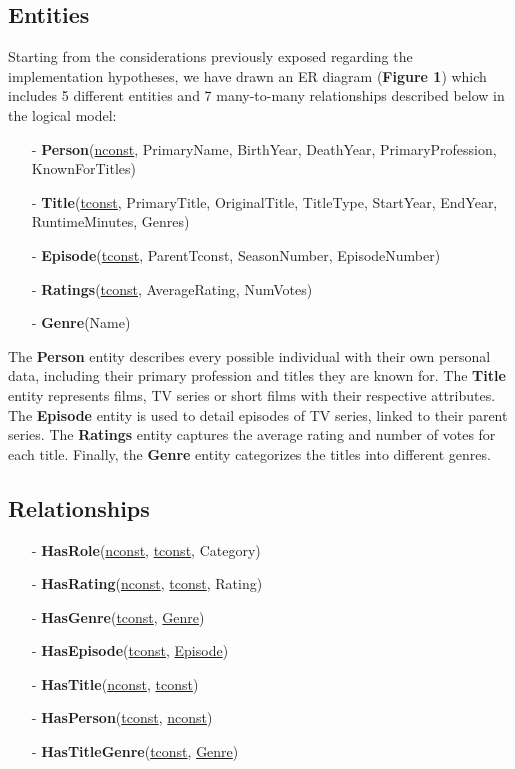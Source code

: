 \documentclass[a4paper,12pt]{article}
\begin{document}
  \subsection{Entities}
\par Starting from the considerations previously exposed regarding the implementation hypotheses, we have drawn an ER diagram (\textbf{Figure 1}) which includes 5 different entities and 7 many-to-many relationships described below in the logical model: \par
  \begin{itemize}[noitemsep]
  \item[-]	\textbf{Person}(\underline{nconst}, PrimaryName, BirthYear, DeathYear, PrimaryProfession, KnownForTitles)
	\item[-]	\textbf{Title}(\underline{tconst}, PrimaryTitle, OriginalTitle, TitleType, StartYear, EndYear, RuntimeMinutes, Genres)
	\item[-]	\textbf{Episode}(\underline{tconst}, ParentTconst, SeasonNumber, EpisodeNumber)
	\item[-]	\textbf{Ratings}(\underline{tconst}, AverageRating, NumVotes)
	\item[-]	\textbf{Genre}(Name)
  \end{itemize} \par
The \textbf{Person} entity describes every possible individual with their own personal data, including their primary profession and titles they are known for. 
The \textbf{Title} entity represents films, TV series or short films with their respective attributes. 
The \textbf{Episode} entity is used to detail episodes of TV series, linked to their parent series. 
The \textbf{Ratings} entity captures the average rating and number of votes for each title. 
Finally, the \textbf{Genre} entity categorizes the titles into different genres.

\subsection{Relationships}
\begin{itemize}[noitemsep]
  \item[-]	\textbf{HasRole}(\underline{nconst}, \underline{tconst}, Category)
  \item[-]	\textbf{HasRating}(\underline{nconst}, \underline{tconst}, Rating)
  \item[-]	\textbf{HasGenre}(\underline{tconst}, \underline{Genre})
  \item[-]	\textbf{HasEpisode}(\underline{tconst}, \underline{Episode})
  \item[-]	\textbf{HasTitle}(\underline{nconst}, \underline{tconst})
  \item[-]	\textbf{HasPerson}(\underline{tconst}, \underline{nconst})
  \item[-]	\textbf{HasTitleGenre}(\underline{tconst}, \underline{Genre})
\end{itemize}
\end{document}
